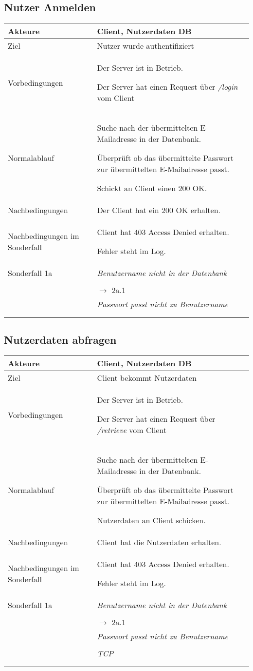 \documentclass[a4paper,10pt,titlepage]{article}
\makeatletter
\newcommand\novspace{\@minipagetrue}
\newenvironment{owncompactitem}{%
\compactitem
}{%
\@finalstrut\@arstrutbox
\@nameuse{endcompactitem}%
\aftergroup\let\aftergroup\@finalstrut\aftergroup\@gobble
}
\newenvironment{owncompactenum}{%
\compactenum
}{%
\@finalstrut\@arstrutbox
\@nameuse{endcompactenum}%
\aftergroup\let\aftergroup\@finalstrut\aftergroup\@gobble
}
\newcommand{\usecase}[7]
{\subsection{#1}
\setlength{\extrarowheight}{2pt}
\begin{tabular}{|p{0.2\textwidth}|p{0.9\textwidth}|}
\hline
  Akteure & #2\\\hline
  Ziel & #3\\\hline
  Vorbedingungen & \novspace
  	\begin{owncompactitem}[-] #4 \end{owncompactitem} \\\hline
  Normalablauf & \vspace{-7pt}
  	\begin{owncompactenum}[1.] #6 \end{owncompactenum} \\\hline
  Nachbedingungen & \novspace
  	\begin{owncompactitem}[-] #5 \end{owncompactitem} \\\hline
  #7
\end{tabular}
}
\newcommand{\sonderfall}[4][\empty]
{
Sonderfall #2 & \vspace{-10pt}
	\textit{#3}
	\begin{owncompactenum}[{#2}.1] {#4} \end{owncompactenum}
  	\ifthenelse{\equal{#1}{\empty}}
    	{\\\hline} %
    	{\ensuremath{\rightarrow} #1 \\ [+1pt] \hline} %

}
\newcommand{\kurzersonderfall}[3][\empty]
{
Sonderfall #2 & \vspace{-10pt}
	\textit{#3}
  	\ifthenelse{\equal{#1}{\empty}}
    	{\\\hline} %
    	{\\&\ensuremath{\rightarrow} #1 \\ [+1pt] \hline} %

}
\newcommand{\sondernachbedingung}[1]
{
Nachbedingungen im Sonderfall& \novspace
	\begin{owncompactitem}[-]
		#1
	\end{owncompactitem} \\\hline
}
\makeatother
\begin{document}
\usecase{Nutzer Anmelden}{Client, Nutzerdaten DB}%
{Nutzer wurde authentifiziert}%
{%
  \item Der Server ist in Betrieb.
  \item Der Server hat einen Request über \textit{/login} vom Client
}
{%
  \item Der Client hat ein 200 OK erhalten.
}
{%
  \item Suche nach der übermittelten E-Mailadresse in der Datenbank.
  \item Überprüft ob das übermittelte Passwort zur übermittelten E-Mailadresse passt.
  \item Schickt an Client einen 200 OK.
}
{%
  \sondernachbedingung{
	\item Client hat 403 Access Denied erhalten.
	\item Fehler steht im Log.
	}
	
  \kurzersonderfall[2a.1]{1a}%
	  {Benutzername nicht in der Datenbank}%
	
  \sonderfall[Fehler]{2a}%
	  {Passwort passt nicht zu Benutzername}%
	  {
	  \item Der Fehler wird ins Log geschrieben.
	  \item An den Client wird ein 403 Access Denied gesendet.
	  }
}

\usecase{Nutzerdaten abfragen}{Client, Nutzerdaten DB}%
{Client bekommt Nutzerdaten}%
{%
  \item Der Server ist in Betrieb.
  \item Der Server hat einen Request über \textit{/retrieve} vom Client
}
{%
  \item Client hat die Nutzerdaten erhalten.
}
{%
  \item Suche nach der übermittelten E-Mailadresse in der Datenbank.
  \item Überprüft ob das übermittelte Passwort zur übermittelten E-Mailadresse passt.
  \item Nutzerdaten an Client schicken. 
}
{%
  \sondernachbedingung{
	\item Client hat 403 Access Denied erhalten.
	\item Fehler steht im Log.
	}
	
  \kurzersonderfall[2a.1]{1a}%
	  {Benutzername nicht in der Datenbank}%
	
  \sonderfall[Fehler]{2a}%
	  {Passwort passt nicht zu Benutzername}%
	  {
	  \item Der Fehler wird ins Log geschrieben.
	  \item An den Client wird ein 403 Access Denied gesendet.
	  }
  \sonderfall[Fehler]{3a}%
	  {TCP}%
	  {
	  \item Der Fehler wird ins Log geschrieben.
	  \item An den Client wird ein 403 Access Denied gesendet.
	  } 
}
\end{document}

